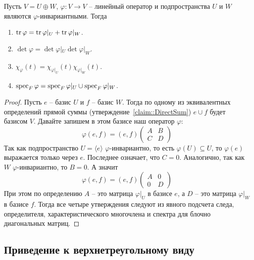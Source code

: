 \begin{claim}
\label{claim::RestrictionChar}
Пусть $V = U\oplus W$, $\varphi\colon V\to V$ -- линейный оператор и подпространства $U$ и $W$ являются $\varphi$-инвариантными.
Тогда
\begin{enumerate}
\item $\operatorname{tr} \varphi = \operatorname{tr} \varphi|_U + \operatorname{tr} \varphi|_W$.

\item $\det \varphi = \det \varphi|_U \det \varphi|_W$.

\item $\chi_\varphi(t) = \chi_{\varphi|_U}(t) \chi_{\varphi|_W}(t)$.

\item $\operatorname{spec}_F \varphi = \operatorname{spec}_F \varphi|_U \cup \operatorname{spec}_F \varphi|_W$.
\end{enumerate}
\end{claim}
\begin{proof}
Пусть $e$ -- базис $U$ и $f$ -- базис $W$.
Тогда по одному из эквивалентных определений прямой суммы (утверждение~\ref{claim::DirectSum}) $e \cup f$ будет базисом $V$.
Давайте запишем в этом базисе наш оператор $\varphi$:
\[
\varphi(e,f) = (e,f)
\begin{pmatrix}
{A}&{B}\\
{C}&{D}
\end{pmatrix}
\]
Так как подпространство $U =\langle e \rangle$ $\varphi$-инвариантно, то есть $\varphi(U)\subseteq U$, то $\varphi(e)$ выражается только через $e$.
Последнее означает, что $C = 0$.
Аналогично, так как $W$ $\varphi$-инвариантно, то $B = 0$.
А значит
\[
\varphi(e,f) = (e,f)
\begin{pmatrix}
{A}&{0}\\
{0}&{D}
\end{pmatrix}
\]
При этом по определению $A$ -- это матрица $\varphi|_U$ в базисе $e$, а $D$ -- это матрица $\varphi|_W$ в базисе $f$.
Тогда все четыре утверждения следуют из явного подсчета следа, определителя, характеристического многочлена и спектра для блочно диагональных матриц.
\end{proof}

\subsection{Приведение к верхнетреугольному виду}

